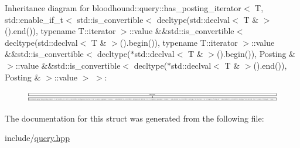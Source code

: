 Inheritance diagram for bloodhound\+:\+:query\+:\+:has\+\_\+posting\+\_\+iterator$<$ T, std\+:\+:enable\+\_\+if\+\_\+t$<$ std\+:\+:is\+\_\+convertible$<$ decltype(std\+:\+:declval$<$ T \& $>$().end()), typename T\+:\+:iterator $>$\+:\+:value \&\&std\+:\+:is\+\_\+convertible$<$ decltype(std\+:\+:declval$<$ T \& $>$().begin()), typename T\+:\+:iterator $>$\+:\+:value \&\&std\+:\+:is\+\_\+convertible$<$ decltype($\ast$std\+:\+:declval$<$ T \& $>$().begin()), Posting \& $>$\+:\+:value \&\&std\+:\+:is\+\_\+convertible$<$ decltype($\ast$std\+:\+:declval$<$ T \& $>$().end()), Posting \& $>$\+:\+:value $>$ $>$\+:\begin{figure}[H]
\begin{center}
\leavevmode
\includegraphics[height=0.480069cm]{structbloodhound_1_1query_1_1has__posting__iterator_3_01T_00_01std_1_1enable__if__t_3_01std_1_1i3aad327a30d60305d06d5c73680c1a38}
\end{center}
\end{figure}


The documentation for this struct was generated from the following file\+:\begin{DoxyCompactItemize}
\item 
include/\hyperlink{query_8hpp}{query.\+hpp}\end{DoxyCompactItemize}

